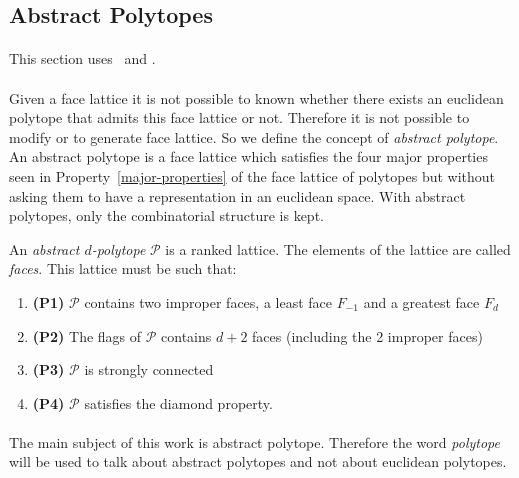 \subsection{Abstract Polytopes}

\paragraph{}
This section uses~\cite{incidenceGeometry} and \cite{abstractRegularPolytopes}.

\paragraph{}
Given a face lattice it is not possible to known whether there exists an euclidean polytope that admits this face lattice or not. Therefore it is not possible to modify or to generate face lattice. So we define the concept of \textit{abstract polytope}. An abstract polytope is a face lattice which satisfies the four major properties seen in Property~\ref{major-properties} of the face lattice of polytopes but without asking them to have a representation in an euclidean space. With abstract polytopes, only the combinatorial structure is kept.

\begin{definition}
  An \textit{abstract $d$-polytope} $\mathcal P$ is a ranked lattice. The elements of the lattice are called \textit{faces}. This lattice must be such that:
  \begin{enumerate}
    \item \textbf{(P1)} $\mathcal P$ contains two improper faces, a least face $F_{-1}$ and a greatest face $F_d$
    \item \textbf{(P2)} The flags of $\mathcal P$ contains $d + 2$ faces (including the 2 improper faces)
    \item \textbf{(P3)} $\mathcal P$ is strongly connected
    \item \textbf{(P4)} $\mathcal P$ satisfies the diamond property.
  \end{enumerate}
\end{definition}

\paragraph{}
The main subject of this work is abstract polytope. Therefore the word \textit{polytope} will be used to talk about abstract polytopes and not about euclidean polytopes.


